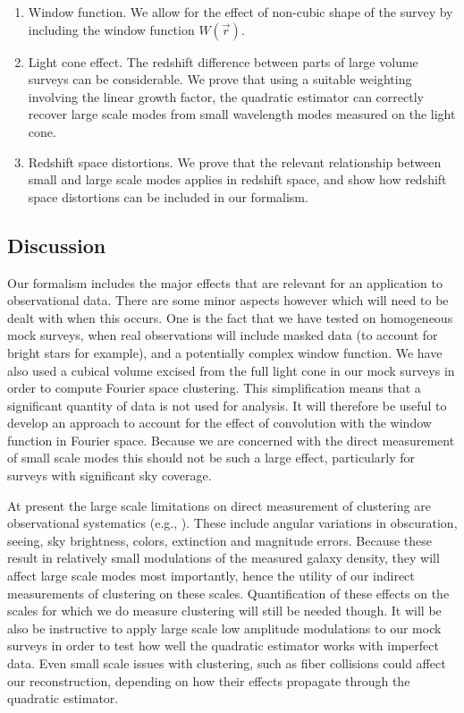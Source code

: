 \documentclass[prd,amsmath,amssymb,floatfix,superscriptaddress,nofootinbib,twocolumn]{revtex4-1}
\newcommand{\vrr}{\vec{r}}
\begin{document}
\begin{enumerate}
\item  Window function. We allow for the effect of non-cubic shape of the survey by including the window function $W(\vrr)$.

\item Light cone effect. The redshift difference between parts of large volume surveys can be considerable. We prove that using a suitable weighting involving the linear growth factor, the quadratic estimator can correctly recover large scale modes from small wavelength modes measured on the light cone.

\item Redshift space distortions. We prove that the relevant relationship between small and large scale modes applies in redshift space, and show how redshift space distortions can be included in our formalism.
\end{enumerate}
 
\subsection{Discussion}

Our formalism includes the major effects that are relevant for an application to observational data. There are some minor aspects however which will need to be dealt with when this occurs. One is the fact that we have tested on homogeneous mock surveys, when real observations will include masked data (to account for bright stars for example), and a potentially complex window function. We have also used a cubical volume excised from the full light cone in our mock surveys in order to compute Fourier space clustering. This simplification means that a significant quantity of data is not used for analysis. It will therefore be useful to develop an approach to account for the effect of convolution with the window function in Fourier space. Because we are concerned with the direct measurement of small scale modes this should not be such a large effect, particularly for surveys with significant sky coverage.

At present the large scale limitations on direct measurement of clustering are observational systematics (e.g., \cite{Ho:2012sh}). These include angular variations in obscuration, seeing, sky brightness, colors, extinction and magnitude errors. Because these result in relatively small modulations of the measured galaxy density, they will affect large scale modes most importantly, hence the utility of our indirect measurements of clustering on these scales. Quantification of these effects on the scales for which we do measure clustering will still be needed though. It will be also be instructive to apply large scale low amplitude modulations to our mock surveys in order to test how well the quadratic estimator works with imperfect data. Even small scale issues with clustering, such as fiber collisions \cite{Hahn:2016kiy} could affect our reconstruction, depending on how their effects propagate through the quadratic estimator.
\end{document}

